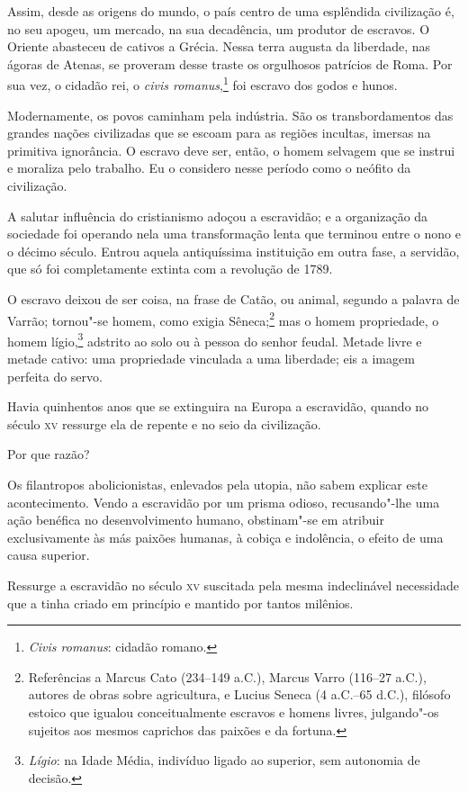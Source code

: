 \begin{linenumbers}
Assim, desde as origens do mundo, o país centro de uma esplêndida \label{origem}
civilização é, no seu apogeu, um mercado, na sua decadência, um
produtor de escravos. O Oriente abasteceu de cativos a Grécia. Nessa
terra augusta da liberdade, nas ágoras de Atenas, se proveram desse
traste os orgulhosos patrícios de Roma. Por sua vez, o cidadão rei, o
\textit{civis romanus},\footnote{ \textit{Civis romanus}: cidadão romano.}
 foi escravo dos godos e hunos. 

Modernamente, os povos caminham pela indústria. São os transbordamentos
das grandes nações civilizadas que se escoam para as regiões incultas,
imersas na primitiva ignorância. O escravo deve ser, então, o homem 	\label{cultura}
selvagem que se instrui e moraliza pelo trabalho. Eu o considero nesse
período como o neófito da civilização.

 A salutar influência do cristianismo adoçou a escravidão; e a
organização da sociedade foi operando nela uma transformação lenta que
terminou entre o nono e o décimo século. Entrou aquela antiquíssima
instituição em outra fase, a servidão, que só foi completamente extinta
com a revolução de 1789. 

O escravo deixou de ser coisa, na frase de Catão, ou animal, segundo a
palavra de Varrão; tornou"-se homem, como exigia
Sêneca;\footnote{ Referências a Marcus Cato (234--149 a.C.), Marcus 
Varro (116--27 a.C.), autores de obras sobre agricultura, e
Lucius Seneca (4 a.C.--65 d.C.), filósofo estoico que igualou conceitualmente escravos 
e homens livres, julgando"-os sujeitos aos mesmos caprichos das paixões e da fortuna.} 
mas o homem propriedade, o homem lígio,\footnote{ \textit{Lígio}: na Idade Média, indivíduo 
ligado ao superior, sem autonomia de decisão.}
 adstrito ao solo ou à pessoa do senhor feudal. Metade livre e metade
cativo: uma propriedade vinculada a uma liberdade; eis a imagem perfeita do servo. 

Havia quinhentos anos que se extinguira na Europa a escravidão, quando
no século \textsc{xv} ressurge ela de repente e no seio da civilização. 

Por que razão? 

Os filantropos abolicionistas, enlevados pela utopia, não sabem explicar
este acontecimento. Vendo a escravidão por um prisma odioso,
recusando"-lhe uma ação benéfica no desenvolvimento humano,
obstinam"-se em atribuir exclusivamente às más paixões humanas, à
cobiça e indolência, o efeito de uma causa superior. 

Ressurge a escravidão no século \textsc{xv} suscitada pela mesma indeclinável
necessidade que a tinha criado em princípio e mantido por tantos milênios. 


\end{linenumbers}
